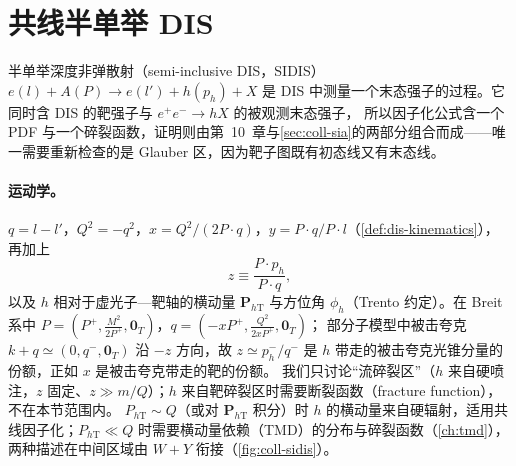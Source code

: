 
\section{共线半单举 DIS}\label{sec:coll-sidis}

半单举深度非弹散射（semi-inclusive DIS，SIDIS）$e(l)+A(P)\to e(l')+h(p_h)+X$ 是 DIS 中测量一个末态强子的过程。它同时含 DIS 的靶强子与 $e^+e^-\to hX$ 的被观测末态强子，
所以因子化公式含一个 PDF 与一个碎裂函数，证明则由第~10~章与\cref{sec:coll-sia}的两部分组合而成——唯一需要重新检查的是 Glauber 区，因为靶子图既有初态线又有末态线。

\paragraph{运动学。}
$q=l-l'$，$Q^2=-q^2$，$x=Q^2/(2P\cdot q)$，$y=P\cdot q/P\cdot l$（\cref{def:dis-kinematics}），再加上
\begin{equation}\label{eq:coll-sidis-z}
z\equiv\frac{P\cdot p_h}{P\cdot q},
\end{equation}
以及 $h$ 相对于虚光子—靶轴的横动量 $\bm P_{h\mathrm T}$ 与方位角 $\phi_h$（Trento 约定\cite{BacchettaEtAl2004}）。在 Breit 系中 $P=(P^+,\frac{M^2}{2P^+},\mathbf 0_T)$，$q=(-xP^+,\frac{Q^2}{2xP^+},\mathbf 0_T)$\cite[式~(12.89)]{Collins2011}；
部分子模型中被击夸克 $k+q\simeq(0,q^-,\mathbf 0_T)$ 沿 $-z$ 方向，故 $z\simeq p_h^-/q^-$ 是 $h$ 带走的被击夸克光锥分量的份额，正如 $x$ 是被击夸克带走的靶的份额。
我们只讨论“流碎裂区”（$h$ 来自硬喷注，$z$ 固定、$z\gg m/Q$）；$h$ 来自靶碎裂区时需要断裂函数（fracture function）\cite[第~12.15~节]{Collins2011}，不在本节范围内。
$P_{h\mathrm T}\sim Q$（或对 $\bm P_{h\mathrm T}$ 积分）时 $h$ 的横动量来自硬辐射，适用共线因子化；$P_{h\mathrm T}\ll Q$ 时需要横动量依赖（TMD）的分布与碎裂函数（\cref{ch:tmd}），两种描述在中间区域由 $W+Y$ 衔接（\cref{fig:coll-sidis}）。

